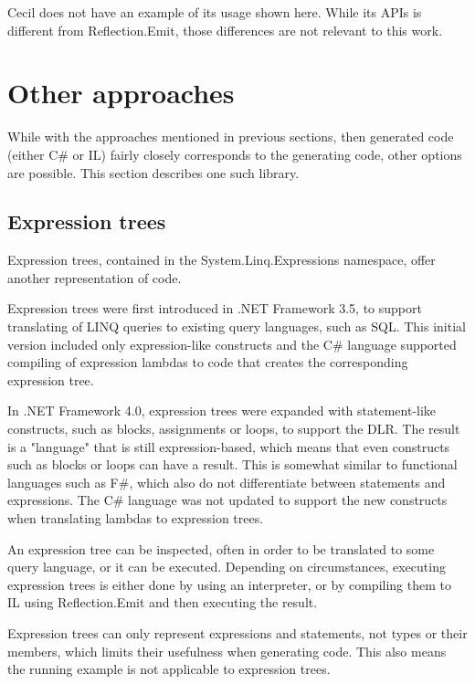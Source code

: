 \medskip

Cecil does not have an example of its usage shown here. While its \acp{API} is different from Reflection.Emit, those differences are not relevant to this work.

\section{Other approaches}

While with the approaches mentioned in previous sections, then generated code (either C\# or \ac{IL}) fairly closely corresponds to the generating code, other options are possible. This section describes one such library.

\subsection{Expression trees}

Expression trees, \cite{expression-trees} contained in the System.Linq.Expressions namespace, offer another representation of code.

Expression trees were first introduced in .NET Framework 3.5, to support translating of \ac{LINQ} queries to existing query languages, such as \ac{SQL}. This initial version included only expression-like constructs and the C\# language supported compiling of expression lambdas to code that creates the corresponding expression tree.

In .NET Framework 4.0, expression trees were expanded with statement-like constructs, such as blocks, assignments or loops, to support the \ac{DLR}. The result is a "language" that is still expression-based, which means that even constructs such as blocks or loops can have a result. This is somewhat similar to functional languages such as F\#, which also do not differentiate between statements and expressions. The C\# language was not updated to support the new constructs when translating lambdas to expression trees.

An expression tree can be inspected, often in order to be translated to some query language, or it can be executed. Depending on circumstances, executing expression trees is either done by using an interpreter, or by compiling them to \ac{IL} using Reflection.Emit and then executing the result.

Expression trees can only represent expressions and statements, not types or their members, which limits their usefulness when generating code. This also means the running example is not applicable to expression trees.

